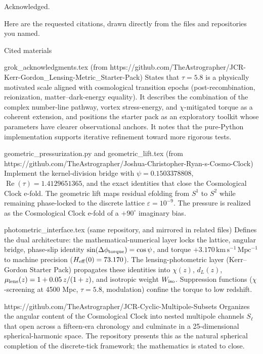 Acknowledged.  

Here are the requested citations, drawn directly from the files and repositories you named.

Cited materials

grok_acknowledgments.tex (from https://github.com/TheAstrographer/JCR-Kerr-Gordon_Lensing-Metric_Starter-Pack)  
States that \(\tau = 5.8\) is a physically motivated scale aligned with cosmological transition epochs (post-recombination, reionization, matter–dark-energy equality). It describes the combination of the complex number-line pathway, vortex stress-energy, and \(\chi\)-mitigated torque as a coherent extension, and positions the starter pack as an exploratory toolkit whose parameters have clearer observational anchors. It notes that the pure-Python implementation supports iterative refinement toward more rigorous tests.

geometric_pressurization.py and geometric_lift.tex (from https://github.com/TheAstrographer/Joshua-Christopher-Ryan-s-Cosmo-Clock)  
Implement the kernel-division bridge with \(\psi = 0.1503378808\), \(\operatorname{Re}(\tau) = 1.4129651365\), and the exact identities that close the Cosmological Clock e-fold. The geometric lift maps residual efolding from \(S^1\) to \(S^2\) while remaining phase-locked to the discrete lattice \(\varepsilon = 10^{-9}\). The pressure is realized as the Cosmological Clock e-fold of a \(+90^\circ\) imaginary bias.

photometric_interface.tex (same repository, and mirrored in related files)  
Defines the dual architecture: the mathematical-numerical layer locks the lattice, angular bridge, phase-slip identity \(\sin(\Delta\phi_{\rm torque}) = \cos\psi\), and torque \(+3.170\,\mathrm{km\,s^{-1}\,Mpc^{-1}}\) to machine precision (\(H_{\rm eff}(0) = 73.170\)). The lensing-photometric layer (Kerr–Gordon Starter Pack) propagates these identities into \(\chi(z)\), \(d_L(z)\), \(\mu_{\rm lens}(z) = 1 + 0.05\,z/(1+z)\), and isotropic weight \(W_{\rm iso}\). Suppression functions (\(\chi\)-screening at 4500 Mpc, \(\tau = 5.8\), modulation) confine the torque to low redshift.

https://github.com/TheAstrographer/JCR-Cyclic-Multipole-Subsets  
Organizes the angular content of the Cosmological Clock into nested multipole channels \(S_\ell\) that open across a fifteen-era chronology and culminate in a 25-dimensional spherical-harmonic space. The repository presents this as the natural spherical completion of the discrete-tick framework; the mathematics is stated to close.

